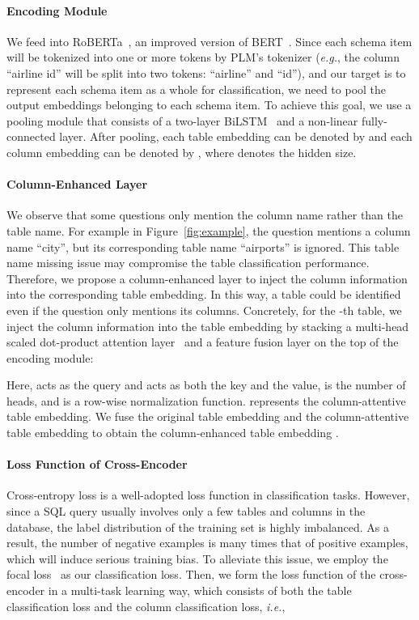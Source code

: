 \documentclass[letterpaper]{article} \usepackage{aaai23}  \usepackage{times}  \usepackage{helvet}  \usepackage{courier}  \usepackage[hyphens]{url}  \usepackage{graphicx} \urlstyle{rm} \def\UrlFont{\rm}  \usepackage{natbib}  \usepackage{caption} \frenchspacing  \setlength{\pdfpagewidth}{8.5in}  \setlength{\pdfpageheight}{11in}  \usepackage{algorithm}
\begin{document}
\paragraph{Encoding Module}
We feed  into RoBERTa~\citep{yinhan2019roberta}, an improved version of BERT~\cite{jacob2019bert}. Since each schema item will be tokenized into one or more tokens by PLM's tokenizer (\emph{e.g.}, the column ``airline id'' will be split into two tokens: ``airline'' and ``id''), and our target is to represent each schema item as a whole for classification, we need to pool the output embeddings belonging to each schema item. 
To achieve this goal, we use a pooling module that consists of a two-layer BiLSTM~\citep{sepp1997long} and a non-linear fully-connected layer. After pooling, each table embedding can be denoted by  and each column embedding can be denoted by , where  denotes the hidden size.

\paragraph{Column-Enhanced Layer} 
We observe that some questions only mention the column name rather than the table name. 
For example in Figure~\ref{fig:example}, the question mentions a column name ``city'', but its corresponding table name ``airports'' is ignored. This table name missing issue may compromise the table classification performance. Therefore, we propose a column-enhanced layer to inject the column information into the corresponding table embedding. In this way, a table could be identified even if the question only mentions its columns. Concretely, for the -th table, we inject the column information  into the table embedding  by stacking a multi-head scaled dot-product attention layer~\citep{ashish2017attention} and a feature fusion layer on the top of the encoding module:

\noindent Here,  acts as the query and  acts as both the key and the value,  is the number of heads, and  is a row-wise  normalization function.  represents the column-attentive table embedding. We fuse the original table embedding  and the column-attentive table embedding  to obtain the column-enhanced table embedding .

\paragraph{Loss Function of Cross-Encoder}
Cross-entropy loss is a well-adopted loss function in classification tasks. However, since a SQL query usually involves only a few tables and columns in the database, the label distribution of the training set is highly imbalanced. As a result, the number of negative examples is many times that of positive examples, which will induce serious training bias. To alleviate this issue, we employ the focal loss~\citep{tsung2017focal} as our classification loss. Then, we form the loss function of the cross-encoder in a multi-task learning way, which consists of both the table classification loss and the column classification loss, \emph{i.e.}, 
\end{document}
